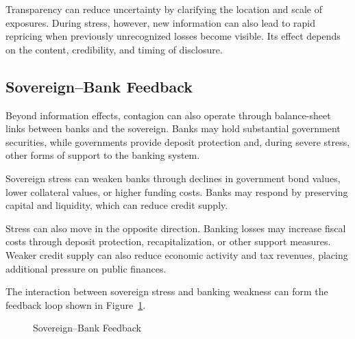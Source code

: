 Transparency can reduce uncertainty by clarifying the location and scale of exposures. During stress, however, new information can also lead to rapid repricing when previously unrecognized losses become visible. Its effect depends on the content, credibility, and timing of disclosure.


\subsection{Sovereign--Bank Feedback}

Beyond information effects, contagion can also operate through balance-sheet links between banks and the sovereign. Banks may hold substantial government securities, while governments provide deposit protection and, during severe stress, other forms of support to the banking system.

Sovereign stress can weaken banks through declines in government bond values, lower collateral values, or higher funding costs. Banks may respond by preserving capital and liquidity, which can reduce credit supply.

Stress can also move in the opposite direction. Banking losses may increase fiscal costs through deposit protection, recapitalization, or other support measures. Weaker credit supply can also reduce economic activity and tax revenues, placing additional pressure on public finances.

The interaction between sovereign stress and banking weakness can form the feedback loop shown in Figure~\ref{fig:ch21-sovereign-bank-feedback}.

\begin{figure}[htbp]
\centering
{}
\caption{Sovereign--Bank Feedback}
\label{fig:ch21-sovereign-bank-feedback}
\end{figure}

